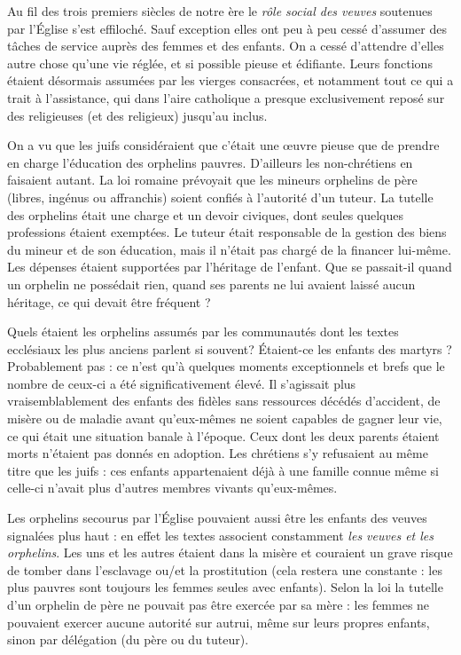  Au fil des trois premiers siècles de notre ère le \emph{rôle social des veuves} soutenues par l'Église s'est effiloché. Sauf exception elles ont peu à peu cessé d'assumer des tâches de service auprès des femmes et des enfants. On a cessé d'attendre d'elles autre chose qu'une vie réglée, et si possible pieuse et édifiante. Leurs fonctions étaient désormais assumées par les vierges consacrées, et notamment tout ce qui a trait à l'assistance, qui dans l'aire catholique a presque exclusivement reposé sur des religieuses (et des religieux) jusqu'au  inclus. 



On a vu que les juifs considéraient que c'était une œuvre pieuse que de prendre en charge l'éducation des orphelins pauvres. D'ailleurs les non-chrétiens en faisaient autant. La loi romaine prévoyait que les mineurs orphelins de père (libres, ingénus ou affranchis) soient confiés à l'autorité d'un tuteur. La tutelle des orphelins était une charge et un devoir civiques, dont seules quelques professions étaient exemptées. Le tuteur était responsable de la gestion des biens du mineur et de son éducation, mais il n'était pas chargé de la financer lui-même. Les dépenses étaient supportées par l'héritage de l'enfant. Que se passait-il quand un orphelin ne possédait rien, quand ses parents ne lui avaient laissé aucun héritage, ce qui devait être fréquent ? 

 Quels étaient les orphelins assumés par les communautés dont les textes ecclésiaux les plus anciens parlent si souvent? Étaient-ce les enfants des martyrs ? Probablement pas : ce n'est qu'à quelques moments exceptionnels et brefs que le nombre de ceux-ci a été significativement élevé. Il s'agissait plus vraisemblablement des enfants des fidèles sans ressources décédés d'accident, de misère ou de maladie avant qu'eux-mêmes ne soient capables de gagner leur vie, ce qui était une situation banale à l'époque. Ceux dont les deux parents étaient morts n'étaient pas donnés en adoption. Les chrétiens s'y refusaient au même titre que les juifs : ces enfants appartenaient déjà à une famille connue même si celle-ci n'avait plus d'autres membres vivants qu'eux-mêmes. 

 Les orphelins secourus par l'Église pouvaient aussi être les enfants des veuves signalées plus haut : en effet les textes associent constamment \emph{les veuves et les orphelins}. Les uns et les autres étaient dans la misère et couraient un grave risque de tomber dans l'esclavage ou/et la prostitution (cela restera une constante : les plus pauvres sont toujours les femmes seules avec enfants). Selon la loi la tutelle d'un orphelin de père ne pouvait pas être exercée par sa mère : les femmes ne pouvaient exercer aucune autorité sur autrui, même sur leurs propres enfants, sinon par délégation (du père ou du tuteur).

